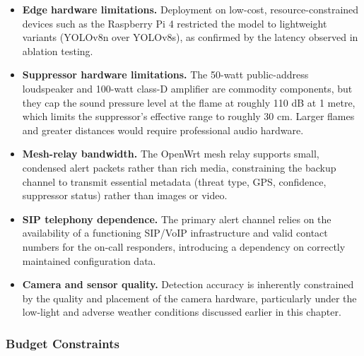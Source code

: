 \begin{itemize}
\item \textbf{Edge hardware limitations.} Deployment on low-cost, resource-constrained devices such as the Raspberry Pi 4 restricted the model to lightweight variants (YOLOv8n over YOLOv8s), as confirmed by the latency observed in ablation testing.

\item \textbf{Suppressor hardware limitations.} The 50-watt public-address loudspeaker and 100-watt class-D amplifier are commodity components, but they cap the sound pressure level at the flame at roughly 110 dB at 1 metre, which limits the suppressor's effective range to roughly 30 cm. Larger flames and greater distances would require professional audio hardware.

\item \textbf{Mesh-relay bandwidth.} The OpenWrt mesh relay supports small, condensed alert packets rather than rich media, constraining the backup channel to transmit essential metadata (threat type, GPS, confidence, suppressor status) rather than images or video.

\item \textbf{SIP telephony dependence.} The primary alert channel relies on the availability of a functioning SIP/VoIP infrastructure and valid contact numbers for the on-call responders, introducing a dependency on correctly maintained configuration data.

\item \textbf{Camera and sensor quality.} Detection accuracy is inherently constrained by the quality and placement of the camera hardware, particularly under the low-light and adverse weather conditions discussed earlier in this chapter.
\end{itemize}

\subsubsection{Budget Constraints}

